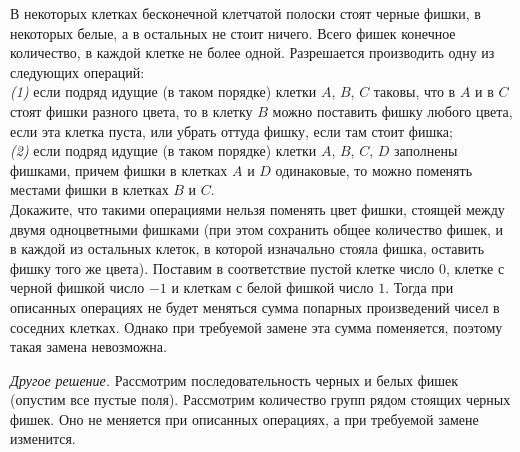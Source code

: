\problem
В некоторых клетках бесконечной клетчатой полоски стоят черные фишки, в
некоторых белые, а в остальных не стоит ничего.
Всего фишек конечное количество, в каждой клетке не более одной.
Разрешается производить одну из следующих операций:
\\\emph{(1)}
если подряд идущие (в таком порядке) клетки $A$, $B$, $C$ таковы, что в $A$ и в
$C$ стоят фишки разного цвета, то в клетку $B$ можно поставить фишку любого
цвета, если эта клетка пуста, или убрать оттуда фишку, если там стоит фишка;
\\\emph{(2)}
если подряд идущие (в таком порядке) клетки $A$, $B$, $C$, $D$ заполнены
фишками, причем фишки в клетках $A$ и $D$ одинаковые, то можно поменять местами
фишки в клетках $B$ и $C$.
\\Докажите, что такими операциями нельзя поменять цвет фишки, стоящей между
двумя одноцветными фишками
(при этом сохранить общее количество фишек, и в каждой из остальных клеток, в
которой изначально стояла фишка, оставить фишку того же цвета).
\solution
Поставим в соответствие пустой клетке число $0$, клетке с черной фишкой число
$-1$ и клеткам с белой фишкой число $1$.
Тогда при описанных операциях не будет меняться сумма попарных произведений
чисел в соседних клетках.
Однако при требуемой замене эта сумма поменяется, поэтому такая замена
невозможна.
\par
\emph{Другое решение.}
Рассмотрим последовательность черных и белых фишек (опустим все пустые поля).
Рассмотрим количество групп рядом стоящих черных фишек.
Оно не меняется при описанных операциях, а при требуемой замене изменится.
\endproblem

